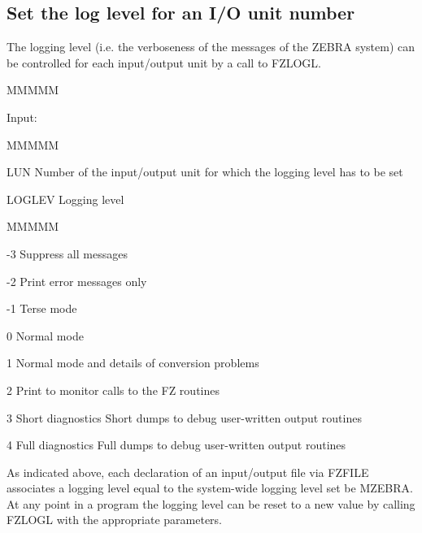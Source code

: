 \subsection{Set the log level for an I/O unit number}
\par The logging level
(i.e. the verboseness of the messages of the ZEBRA system) can be
controlled for each input/output unit by a call to FZLOGL.
\begin{DL}{MMMMM}
\item[Input:
]
\begin{DL}{MMMMM}
\item[LUN
]Number of the input/output unit
for which the logging level has to be set
\item[LOGLEV
]Logging level
\begin{DL}{MMMMM}
\item[-3
]Suppress all messages
\item[-2
]Print error messages only
\item[-1
]Terse mode
\item[ 0
]Normal mode
\item[ 1
]Normal mode and details of conversion problems
\item[ 2
]Print to monitor calls to the FZ routines
\item[ 3
]Short diagnostics
\newline Short dumps to debug user-written output routines
\item[ 4
]Full diagnostics
\newline Full dumps to debug user-written output routines
\end{DL}
\end{DL}
\end{DL}
\par
As indicated above, each declaration of an input/output file via FZFILE
associates a logging level equal to the system-wide logging level
set be MZEBRA.
At any point in a program the logging level can be reset to a new
value by calling FZLOGL with the appropriate parameters.
